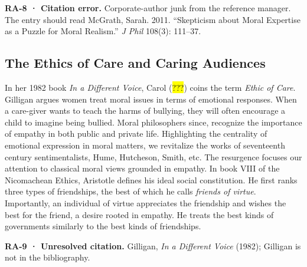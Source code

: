 \documentclass[
  letterpaper,
  DIV=11,
  numbers=noendperiod]{scrartcl}
\theoremstyle{remark}
\begin{document}
\begin{tcolorbox}[enhanced jigsaw, arc=.35mm, bottomrule=.15mm, bottomtitle=1mm, breakable, colback=white, colbacktitle=quarto-callout-warning-color!10!white, colframe=quarto-callout-warning-color-frame, coltitle=black, left=2mm, leftrule=.75mm, opacityback=0, opacitybacktitle=0.6, rightrule=.15mm, title=\textcolor{quarto-callout-warning-color}{\faExclamationTriangle}\hspace{0.5em}{Warning}, titlerule=0mm, toprule=.15mm, toptitle=1mm]

\textbf{RA-8 · Citation error.} Corporate-author junk from the reference
manager. The entry should read McGrath, Sarah. 2011. ``Skepticism about
Moral Expertise as a Puzzle for Moral Realism.'' \emph{J Phil} 108(3):
111--37.

\end{tcolorbox}

\subsection{The Ethics of Care and Caring
Audiences}\label{the-ethics-of-care-and-caring-audiences}

In her 1982 book \emph{In a Different Voice}, Carol (\hl{???}) coins the
term \emph{Ethic of Care}. Gilligan argues women treat moral issues in
terms of emotional responses. When a care-giver wants to teach the harms
of bullying, they will often encourage a child to imagine being bullied.
Moral philosophers since, recognize the importance of empathy in both
public and private life. Highlighting the centrality of emotional
expression in moral matters, we revitalize the works of seventeenth
century sentimentalists, Hume, Hutcheson, Smith, etc. The resurgence
focuses our attention to classical moral views grounded in empathy. In
book VIII of the Nicomachean Ethics, Aristotle defines his ideal social
constitution. He first ranks three types of friendships, the best of
which he calls \emph{friends of virtue}. Importantly, an individual of
virtue appreciates the friendship and wishes the best for the friend, a
desire rooted in empathy. He treats the best kinds of governments
similarly to the best kinds of friendships.

\begin{tcolorbox}[enhanced jigsaw, arc=.35mm, bottomrule=.15mm, bottomtitle=1mm, breakable, colback=white, colbacktitle=quarto-callout-warning-color!10!white, colframe=quarto-callout-warning-color-frame, coltitle=black, left=2mm, leftrule=.75mm, opacityback=0, opacitybacktitle=0.6, rightrule=.15mm, title=\textcolor{quarto-callout-warning-color}{\faExclamationTriangle}\hspace{0.5em}{Warning}, titlerule=0mm, toprule=.15mm, toptitle=1mm]

\textbf{RA-9 · Unresolved citation.} Gilligan, \emph{In a Different
Voice} (1982); Gilligan is not in the bibliography.

\end{tcolorbox}
\end{document}
